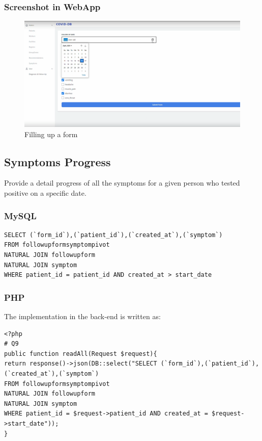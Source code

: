 \subsubsection{Screenshot in WebApp}    
\begin{figure}[h]
    \centering
    \includegraphics[scale=0.35]{imgs/fillingAForm.PNG}
    \caption{Filling up a form}
\end{figure}


\newpage

\subsection{Symptoms Progress}
Provide a detail progress of all the symptoms for a given person who tested positive on a specific date.
\subsubsection{MySQL}

\begin{verbatim}
SELECT (`form_id`),(`patient_id`),(`created_at`),(`symptom`)
FROM followupformsymptompivot 
NATURAL JOIN followupform
NATURAL JOIN symptom 
WHERE patient_id = patient_id AND created_at > start_date
\end{verbatim}

\subsubsection{PHP}
The implementation in the back-end is written as:
\begin{verbatim}
<?php
# Q9
public function readAll(Request $request){
return response()->json(DB::select("SELECT (`form_id`),(`patient_id`),(`created_at`),(`symptom`)
FROM followupformsymptompivot 
NATURAL JOIN followupform
NATURAL JOIN symptom 
WHERE patient_id = $request->patient_id AND created_at = $request->start_date"));
}
\end{verbatim}


